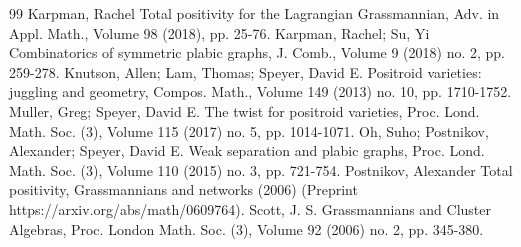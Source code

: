 \begin{thebibliography}{99}
 Karpman, Rachel Total positivity for the Lagrangian Grassmannian, Adv. in Appl. Math., Volume 98 (2018), pp. 25-76.
 Karpman, Rachel; Su, Yi Combinatorics of symmetric plabic graphs, J. Comb., Volume 9 (2018) no. 2, pp. 259-278.
 Knutson, Allen; Lam, Thomas; Speyer, David E. Positroid varieties: juggling and geometry, Compos. Math., Volume 149 (2013) no. 10, pp. 1710-1752.
 Muller, Greg; Speyer, David E. The twist for positroid varieties, Proc. Lond. Math. Soc. (3), Volume 115 (2017) no. 5, pp. 1014-1071.
 Oh, Suho; Postnikov, Alexander; Speyer, David E. Weak separation and plabic graphs, Proc. Lond. Math. Soc. (3), Volume 110 (2015) no. 3, pp. 721-754.
 Postnikov, Alexander Total positivity, Grassmannians and networks (2006) (Preprint https://arxiv.org/abs/math/0609764).
 Scott, J. S. Grassmannians and Cluster Algebras, Proc. London Math. Soc. (3), Volume 92 (2006) no. 2, pp. 345-380.
\end{thebibliography}
